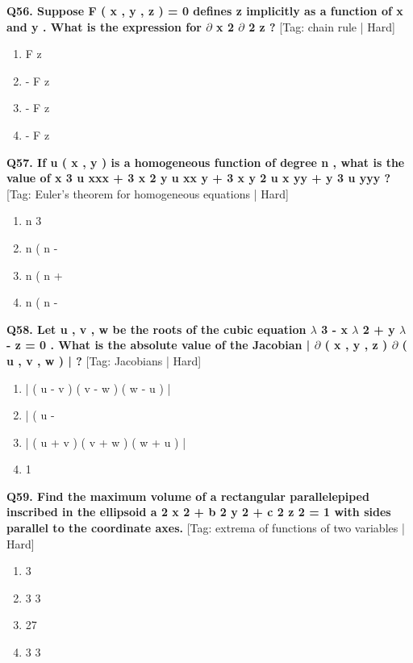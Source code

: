 \noindent\textbf{Q56. Suppose F ( x , y , z ) = 0 defines z implicitly as a function of x and y . What is the expression for $\partial$ x 2 $\partial$ 2 z ?} \hfill [Tag: chain rule | Hard]
\begin{enumerate}[label=(\alph*),topsep=2pt,itemsep=1pt,partopsep=0pt,parsep=0pt]
    \item {{F z}}
    \item {{- F z}}
    \item {{- F z}}
    \item {{- F z}}
\end{enumerate}
\vspace{2mm}

\noindent\textbf{Q57. If u ( x , y ) is a homogeneous function of degree n , what is the value of x 3 u xxx + 3 x 2 y u xx y + 3 x y 2 u x yy + y 3 u yyy ?} \hfill [Tag: Euler's theorem for homogeneous equations | Hard]
\begin{enumerate}[label=(\alph*),topsep=2pt,itemsep=1pt,partopsep=0pt,parsep=0pt]
    \item {{n 3}}
    \item {{n ( n -}}
    \item {{n ( n +}}
    \item {{n ( n -}}
\end{enumerate}
\vspace{2mm}

\noindent\textbf{Q58. Let u , v , w be the roots of the cubic equation $\lambda$ 3 - x $\lambda$ 2 + y $\lambda$ - z = 0 . What is the absolute value of the Jacobian | $\partial$ ( x , y , z ) $\partial$ ( u , v , w ) | ?} \hfill [Tag: Jacobians | Hard]
\begin{enumerate}[label=(\alph*),topsep=2pt,itemsep=1pt,partopsep=0pt,parsep=0pt]
    \item {{| ( u - v ) ( v - w ) ( w - u ) |}}
    \item {{| ( u -}}
    \item {{| ( u + v ) ( v + w ) ( w + u ) |}}
    \item {{1}}
\end{enumerate}
\vspace{2mm}

\noindent\textbf{Q59. Find the maximum volume of a rectangular parallelepiped inscribed in the ellipsoid a 2 x 2 + b 2 y 2 + c 2 z 2 = 1 with sides parallel to the coordinate axes.} \hfill [Tag: extrema of functions of two variables | Hard]
\begin{enumerate}[label=(\alph*),topsep=2pt,itemsep=1pt,partopsep=0pt,parsep=0pt]
    \item {{3}}
    \item {{3 3}}
    \item {{27}}
    \item {{3 3}}
\end{enumerate}
\vspace{2mm}

